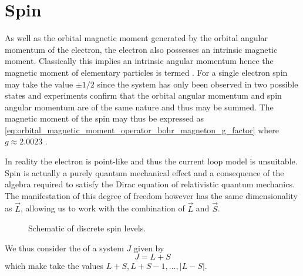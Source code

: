 \section{Spin}
As well as the orbital magnetic moment generated by the orbital angular momentum of the electron, the electron also possesses an intrinsic magnetic moment. Classically this implies an intrinsic angular momentum hence the magnetic moment of elementary particles is termed . 
For a single electron spin may take the value $\pm 1/2$ since the system has only been observed in two possible states \cite{Gerlach1922} and experiments confirm that the orbital angular momentum and spin angular momentum are of the same nature and thus may be summed. 
The magnetic moment of the spin may thus be expressed as \eqref{eq:orbital_magnetic_moment_operator_bohr_magneton_g_factor} \cite{Povh2002-fj} where $g\approx2.0023$ \cite{electron-g-factor, PhysRevLett.130.071801}. 

\begin{wrapfigure}{l}{0.2\textwidth}%
    \centering%
        
\end{wrapfigure}%

In reality the electron is point-like and thus the current loop model is unsuitable. Spin is actually a purely quantum mechanical effect and a consequence of the algebra required to satisfy the Dirac equation of relativistic quantum mechanics. The manifestation of this degree of freedom however has the same dimensionality as $\vec{L}$, allowing us to work with the combination of $\vec{L}$ and $\vec{S}$. 

\begin{wrapfigure}{r}{0.3\textwidth}%
    \begin{center}
        
  \caption{Schematic of discrete spin levels.}%
\end{center}
\end{wrapfigure}


We thus consider the  of a system $J$ given by 
\begin{equation}
    J = L + S 
    \label{eq:total_angular_momentum}
\end{equation}
which make take the values $L+S, L+ S - 1, \dots, |L-S|$. 

